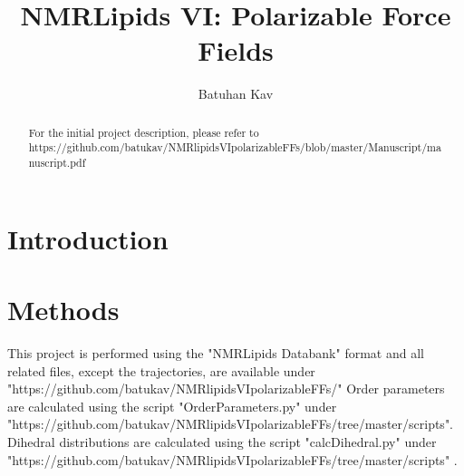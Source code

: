 \documentclass[journal=jacsat,manuscript=article,layout=singlecolumn]{achemso}
\author{Batuhan Kav}
\affiliation{Forschungszentrum Juelich, Germany}
\title{NMRLipids VI: Polarizable Force Fields}
\begin{document}


\begin{abstract}
	
	For the initial project description, please refer to \\ https://github.com/batukav/NMRlipidsVIpolarizableFFs/blob/master/Manuscript/manuscript.pdf
	
\end{abstract}

\section{Introduction}

\section{Methods}

This project is performed using the "NMRLipids Databank" format and all related files, except the trajectories, are available under\\ "https://github.com/batukav/NMRlipidsVIpolarizableFFs/"
Order parameters are calculated using the script "OrderParameters.py" under\\ "https://github.com/batukav/NMRlipidsVIpolarizableFFs/tree/master/scripts". \\
Dihedral distributions are calculated using the script "calcDihedral.py" under\\ "https://github.com/batukav/NMRlipidsVIpolarizableFFs/tree/master/scripts" .\\
\end{document}
